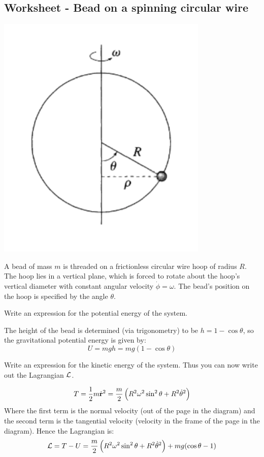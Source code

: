 \subsection{Worksheet - Bead on a spinning circular wire}
\begin{center}
\includegraphics[scale=1]{Lecture-5/W5-img1.png}
\end{center}
A bead of mass $m$ is threaded on a frictionless circular wire hoop of radius $R$. The hoop lies in a vertical plane, which is forced to rotate about the hoop's vertical diameter with constant angular velocity $\dot{\phi} = \omega$. The bead's position on the hoop is specified by the angle $\theta$.

\begin{p}
Write an expression for the potential energy of the system.
\end{p}
\begin{s}
The height of the bead is determined (via trigonometry) to be $h = 1 - \cos\theta$, so the gravitational potential energy is given by:
\[U = mgh = mg(1-\cos\theta)\]
\end{s}

\begin{p}
Write an expression for the kinetic energy of the system. Thus you can now write out the Lagrangian $\mathcal{L}$.
\end{p}
\begin{s}
\[T = \frac{1}{2}m\dot{\mathbf{r}}^2 = \frac{m}{2}\left(R^2\omega^2\sin^2\theta + R^2\dot{\theta}^2\right) \]
Where the first term is the normal velocity (out of the page in the diagram) and the second term is the tangential velocity (velocity in the frame of the page in the diagram). Hence the Lagrangian is:
\[\mathcal{L} = T - U = \frac{m}{2}\left(R^2\omega^2\sin^2\theta + R^2\dot{\theta}^2\right) +mg(\cos\theta-1)\] 
\end{s}

